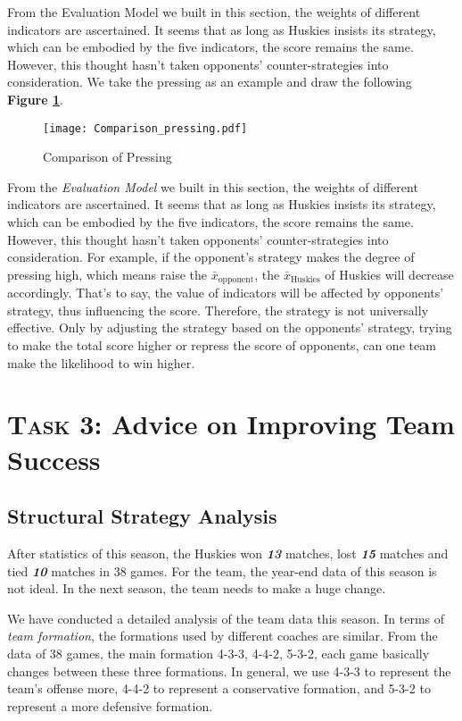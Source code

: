 \documentclass[12pt]{article}  %
\begin{document}
From the Evaluation Model we built in this section, the weights of different indicators are ascertained. It seems that as long as Huskies insists its strategy, which can be embodied by the five indicators, the score remains the same. However, this thought hasn't taken opponents' counter-strategies into consideration. We take the pressing as an example and draw the following \textbf{Figure \ref{fig:Comparison_pressing}}.
\begin{figure}[htbp]
    \centering
    \texttt{[image: Comparison\_pressing.pdf]} 	%
    \caption{Comparison of Pressing}		%
    \label{fig:Comparison_pressing}							%
\end{figure}

From the \textit{Evaluation Model} we built in this section, the weights of different indicators are ascertained. It seems that as long as Huskies insists its strategy, which can be embodied by the five indicators, the score remains the same. However, this thought hasn't taken opponents' counter-strategies into consideration. For example, if the opponent's strategy makes the degree of pressing high, which means raise the $\bar{x}_{\mathrm{opponent}}$, the $\bar{x}_{\mathrm{Huskies}}$ of Huskies will decrease accordingly. That's to say, the value of indicators will be affected by opponents' strategy, thus influencing the score. Therefore, the strategy is not universally effective. Only by adjusting the strategy based on the opponents' strategy, trying to make the total score higher or repress the score of opponents, can one team make the likelihood to win higher. 





\section{\textsc{Task 3: }Advice on Improving Team Success}
\subsection{Structural Strategy Analysis}

After statistics of this season, the Huskies won \textbf{\textit{13}} matches, lost \textbf{\textit{15}} matches and tied \textbf{\textit{10}} matches in 38 games. For the team, the year-end data of this season is not ideal. In the next season, the team needs to make a huge change.

We have conducted a detailed analysis of the team data this season. In terms of \textit{team formation}, the formations used by different coaches are similar. From the data of 38 games, the main formation \textsf{4-3-3}, \textsf{4-4-2}, \textsf{5-3-2}, each game basically changes between these three formations. In general, we use \textsf{4-3-3} to represent the team's offense more, \textsf{4-4-2} to represent a conservative formation, and \textsf{5-3-2} to represent a more defensive formation. 
\end{document}
